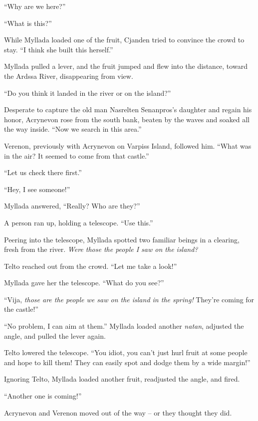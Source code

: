 ``Why are we here?''

``What is this?''

While Myllada loaded one of the fruit, Cjanden tried to convince the crowd to stay. ``I think she built this herself.''

Myllada pulled a lever, and the fruit jumped and flew into the distance, toward the Ardssa River, disappearing from view.

``Do you think it landed in the river or on the island?''

\centeredstars

Desperate to capture the old man Nasrelten Senanpros's daughter and regain his honor, Acrynevon rose from the south bank, beaten by the waves and soaked all the way inside. ``Now we search in this area.''

Verenon, previously with Acrynevon on Varpiss Island, followed him. ``What was in the air? It seemed to come from that castle.''

``Let us check there first.''

\centeredstars

``Hey, I see someone!''

Myllada answered, ``Really? Who are they?''

A person ran up, holding a telescope. ``Use this.''

Peering into the telescope, Myllada spotted two familiar beings in a clearing, fresh from the river. \emph{Were those the people I saw on the island?}

Telto reached out from the crowd. ``Let me take a look!''

Myllada gave her the telescope. ``What do you see?''

``Vija, \emph{those are the people we saw on the island in the spring!} They're coming for the castle!''

``No problem, I can aim at them.'' Myllada loaded another \emph{natan}, adjusted the angle, and pulled the lever again.

Telto lowered the telescope. ``You idiot, you can't just hurl fruit at some people and hope to kill them! They can easily spot and dodge them by a wide margin!''

Ignoring Telto, Myllada loaded another fruit, readjusted the angle, and fired.

\centeredstars

``Another one is coming!''

Acrynevon and Verenon moved out of the way -- or they thought they did.

